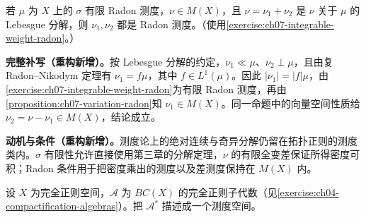 \documentclass[../../main.tex]{subfiles}
\begin{document}
\begin{exercise}\label{exercise:ch07-radon-lebesgue-decomposition}
若 $\mu$ 为 $X$ 上的 $\sigma$ 有限 Radon 测度，$\nu\in M(X)$，且 $\nu=\nu_1+\nu_2$ 是 $\nu$ 关于 $\mu$ 的 Lebesgue 分解，则 $\nu_1,\nu_2$ 都是 Radon 测度。（使用\cref{exercise:ch07-integrable-weight-radon}。）
\end{exercise}
\begin{solution}
\textbf{完整补写（重构新增）。}按 Lebesgue 分解的约定，$\nu_1\ll\mu$、$\nu_2\perp\mu$，且由复 Radon--Nikodym 定理有 $\nu_1=f\mu$，其中 $f\in L^1(\mu)$。因此 $|\nu_1|=|f|\mu$，由\cref{exercise:ch07-integrable-weight-radon}为有限 Radon 测度，再由\cref{proposition:ch07-variation-radon}知 $\nu_1\in M(X)$。同一命题中的向量空间性质给 $\nu_2=\nu-\nu_1\in M(X)$，结论成立。
\end{solution}
\begin{remark}
\textbf{动机与条件（重构新增）。}测度论上的绝对连续与奇异分解仍留在拓扑正则的测度类内。$\sigma$ 有限性允许直接使用第三章的分解定理，$\nu$ 的有限全变差保证所得密度可积；Radon 条件用于把密度乘出的测度以及差测度保持在 $M(X)$ 内。
\end{remark}
\begin{exercise}\label{exercise:ch07-algebra-dual}
设 $X$ 为完全正则空间，$\mathcal A$ 为 $BC(X)$ 的完全正则子代数（见\cref{exercise:ch04-compactification-algebras}）。把 $\mathcal A^*$ 描述成一个测度空间。
\end{exercise}
\end{document}
